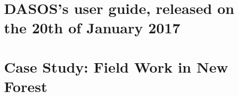 \documentclass[11pt,nofootinbib]{report}
\begin{document}
	    
	    {}
        \newpage

   \setcounter{secnumdepth}{4}
  
   	
		\newpage
		\thispagestyle{empty}
		\newpage
				
				
	\begin{appendices}
	\chapter{DASOS's user guide, released on the 20th of January 2017}\label{DASOS_userGuide}
		 	
	\chapter{Case Study: Field Work in New Forest}\label{Fieldwork}
		 
		\newpage
	\end{appendices}
    
\end{document}
